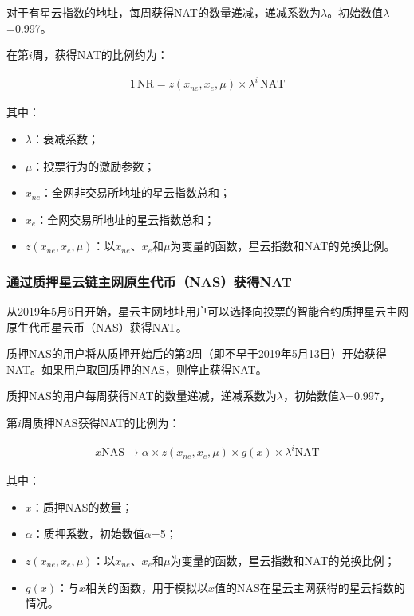 对于有星云指数的地址，每周获得NAT的数量递减，递减系数为$\lambda$。初始数值$\lambda$=0.997。

在第$i$周，获得NAT的比例约为：

\begin{align}
1\,\text{NR}=z(x_{ne},x_{e},\mu)\times\lambda^{i}\,\text{NAT}
\end{align} 

其中：
\begin{itemize}
	\item $\lambda$：衰减系数；
	\item $\mu$：投票行为的激励参数；
	\item $x_{ne}$：全网非交易所地址的星云指数总和；
	\item $x_{e}$：全网交易所地址的星云指数总和；
	\item $z(x_{ne},x_{e},\mu)$：以$x_{ne}$、$x_{e}$和$\mu$为变量的函数，星云指数和NAT的兑换比例。
\end{itemize}

\subsubsection{通过质押星云链主网原生代币（NAS）获得NAT}

从2019年5月6日开始，星云主网地址用户可以选择向投票的智能合约质押星云主网原生代币星云币（NAS）获得NAT。

质押NAS的用户将从质押开始后的第2周（即不早于2019年5月13日）开始获得NAT。如果用户取回质押的NAS，则停止获得NAT。

质押NAS的用户每周获得NAT的数量递减，递减系数为$\lambda$，初始数值$\lambda$=0.997，

第$i$周质押NAS获得NAT的比例为： 

\begin{align}
x \text{NAS} \rightarrow \alpha \times z(x_{ne},x_{e},\mu)\times g(x) \times \lambda^{i} \text{NAT}
\end{align}

其中：

\begin{itemize}
	\item $x$：质押NAS的数量；
	\item $\alpha$：质押系数，初始数值$\alpha$=5；
	\item $z(x_{ne},x_{e},\mu)$：以$x_{ne}$、$x_{e}$和$\mu$为变量的函数，星云指数和NAT的兑换比例；
	\item $g(x)$：与$x$相关的函数，用于模拟以$x$值的NAS在星云主网获得的星云指数的情况。
\end{itemize}

